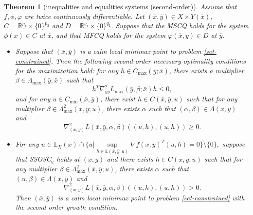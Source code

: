 \documentclass[11pt]{article}
\numberwithin{equation}{section}
\newtheorem{theorem}{Theorem}[section]
\begin{document}
{ \begin{theorem}[inequalities and equalities systems (second-order)]\label{second-dual}Assume that  $f,\phi, \varphi$ are twice continuously differentiable.         Let $(\bar x,\bar y) \in X \times  Y(\bar x)$, $C=\mathbb{R}^{p_1}_- \times \{0\}^{p_2}$ and $D=\mathbb{R}^{q_1}_- \times \{0\}^{q_2}$. Suppose that the MSCQ holds for the system $\phi(x)\in C$ at $\bar x$, and that MFCQ holds for the system $\varphi(\bar x,y)\in D$ at $\bar y$.
  \begin{itemize}
 \item[(a)] Suppose that  $(\bar x,\bar y)$ is a calm local minimax point to problem \eqref{set-constrained}. Then the following second-order necessary optimality conditions for the maximization hold:
 for any $h \in C_{\max}(\bar y;\bar x)$, there exists a multiplier $\beta \in \Lambda_{\max}(\bar y; \bar x)$ such that
\begin{equation*}
h^T \nabla^2_{yy} L_{\max}(\bar y,\beta;\bar x) h  \leq 0,
\end{equation*}
and for any $u \in C_{\min}(\bar x,\bar y)$, there exist $h \in C(\bar x,\bar y;u)$ { such that for any multiplier $\beta \in \Lambda^2_{\operatorname{max}}(\bar x,\bar y;u)$,  there exists $\alpha$ such that $(\alpha, \beta)\in \Lambda(\bar x,\bar y)$ and}
\begin{equation}\label{withh}
\nabla^2_{(x,y)} L(\bar x,\bar y,\alpha,\beta)((u,h),(u,h))  \geq 0.
\end{equation}

  \item[(b)] 
For any 
$ u\in \mathbb{L}_X(\bar x)\cap \{ u|\sup\limits_{h \in \mathbb{L}(\bar x,\bar y;u)} \nabla f(\bar x,\bar y)^T(u,h) =  0\} \setminus \{0\}, $  suppose that SSOSC$_u$ holds at $(\bar x,\bar y)$ and  there exists $h \in C(\bar x,\bar y;u)$ such that for any multiplier $\beta \in \Lambda^2_{\operatorname{max}}(\bar x,\bar y;u)$,  there exists $\alpha$ such that $(\alpha, \beta)\in \Lambda(\bar x,\bar y)$ and
\begin{equation}\label{withhsuf}
\nabla^2_{(x,y)} L(\bar x,\bar y,\alpha,\beta)((u,h),(u,h)) > 0.
\end{equation} 
Then $(\bar x,\bar y)$ is a calm local minimax point to problem \eqref{set-constrained} {with the second-order growth condition.
}
\end{itemize}
   \end{theorem}

}
\end{document}
